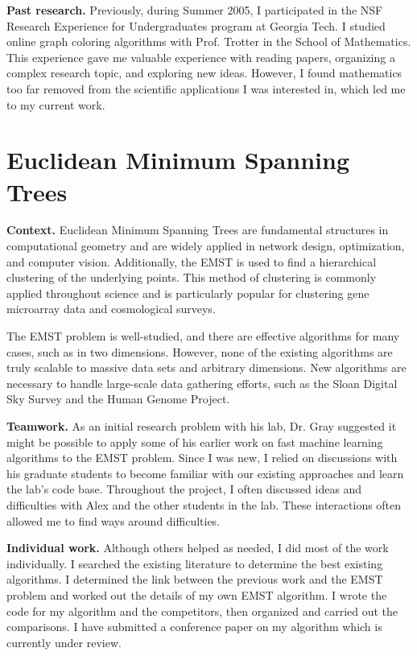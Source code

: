 \documentclass[twoside,leqno, 12pt]{article}
\begin{document}
\textbf{Past research.}  Previously, during Summer 2005, I participated in the NSF Research Experience for Undergraduates program at Georgia Tech.  I studied online graph coloring algorithms with Prof. Trotter in the School of Mathematics.  This experience gave me valuable experience with reading papers, organizing a complex research topic, and exploring new ideas.  However, I found mathematics too far removed from the scientific applications I was interested in, which led me to my current work.


\section{Euclidean Minimum Spanning Trees}

\textbf{Context.}  Euclidean Minimum Spanning Trees are fundamental structures in computational geometry and are widely applied in network design, optimization, and computer vision.  Additionally, the EMST is used to find a hierarchical clustering of the underlying points.  This method of clustering is commonly applied throughout science and is particularly popular for clustering gene microarray data and cosmological surveys.  

The EMST problem is well-studied, and there are effective algorithms for many cases, such as in two dimensions.  However, none of the existing algorithms are truly scalable to massive data sets and arbitrary dimensions.  New algorithms are necessary to handle large-scale data gathering efforts, such as the Sloan Digital Sky Survey and the Human Genome Project.

\textbf{Teamwork.}  As an initial research problem with his lab, Dr. Gray suggested it might be possible to apply some of his earlier work on fast machine learning algorithms to the EMST problem.  Since I was new, I relied on discussions with his graduate students to become familiar with our existing approaches and learn the lab's code base.  Throughout the project, I often discussed ideas and difficulties with Alex and the other students in the lab.  These interactions often allowed me to find ways around difficulties.

\textbf{Individual work.}  Although others helped as needed, I did most of the work individually.  I searched the existing literature to determine the best existing algorithms.  I determined the link between the previous work and the EMST problem and worked out the details of my own EMST algorithm.  I wrote the code for my algorithm and the competitors, then organized and carried out the comparisons.  I have submitted a conference paper on my algorithm which is currently under review.  
\end{document}
